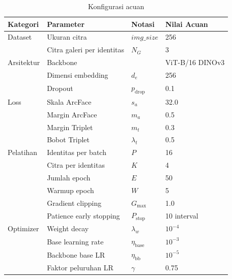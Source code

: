 \begin{table}[ht]
    \centering
    \caption{Konfigurasi acuan}
    \label{tab:default}
    \renewcommand{\arraystretch}{1.25}
    \begin{tabular}{llll}
        \hline
        \textbf{Kategori} & \textbf{Parameter}         & \textbf{Notasi}      & \textbf{Nilai Acuan} \\
        \hline
        Dataset           & Ukuran citra               & $\mathit{img\_size}$ & 256                  \\
                          & Citra galeri per identitas & $N_G$                & 3                    \\
        \hline
        Arsitektur        & Backbone                   &                      & ViT-B/16 DINOv3      \\
                          & Dimensi embedding          & $d_e$                & 256                  \\
                          & Dropout                    & $p_{\text{drop}}$    & 0{.}1                \\
        \hline
        Loss              & Skala ArcFace              & $s_a$                & 32{.}0               \\
                          & Margin ArcFace             & $m_a$                & 0{.}5                \\
                          & Margin Triplet             & $m_t$                & 0{.}3                \\
                          & Bobot Triplet              & $\lambda_t$          & 0{.}5                \\
        \hline
        Pelatihan         & Identitas per batch        & $P$                  & 16                   \\
                          & Citra per identitas        & $K$                  & 4                    \\
                          & Jumlah epoch               & $E$                  & 50                   \\
                          & Warmup epoch               & $W$                  & 5                    \\
                          & Gradient clipping          & $G_{\max}$           & 1{.}0                \\
                          & Patience early stopping    & $P_{\text{stop}}$    & 10 interval          \\
        \hline
        Optimizer         & Weight decay               & $\lambda_w$          & $10^{-4}$            \\
                          & Base learning rate         & $\eta_{\text{base}}$ & $10^{-3}$            \\
                          & Backbone base LR           & $\eta_{\text{bb}}$   & $10^{-5}$            \\
                          & Faktor peluruhan LR        & $\gamma$             & 0{.}75               \\
        \hline
    \end{tabular}
\end{table}

